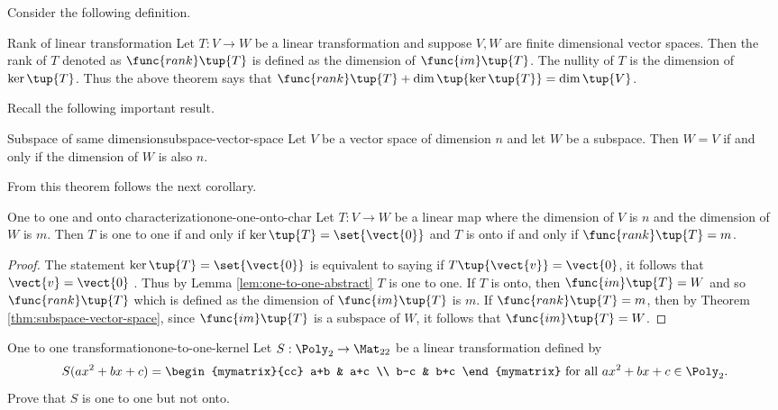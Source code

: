 Consider the following definition. 

\begin{definition}{Rank of linear transformation}{}
Let $T:V\rightarrow W$ be a linear transformation and suppose $V,W$ are finite dimensional vector spaces. Then
the rank of $T$ denoted as $\func{rank}\tup{T} $ is defined as the
dimension of $\func{im}\tup{T}$. The nullity of $T$ is the
dimension of $\ker \tup{T}$. Thus the above theorem says that $
\func{rank}\tup{T} +\dim \tup{\ker \tup{T} } =\dim
\tup{V}$.
\end{definition}

Recall the following important result. 

\begin{theorem}{Subspace of same dimension}{subspace-vector-space}
Let $V$ be a vector space of dimension $n$ and let $W$ be a
subspace. Then $W=V$ if and only if the dimension of $W$ is also $n$.
\end{theorem}

From this theorem follows the next corollary.

\begin{corollary}{One to one and onto characterization}{one-one-onto-char}
Let $T:V\rightarrow W$ be a linear map where the dimension of $V$ is $n$ and
the dimension of $W$ is $m$. Then $T$ is one to one if and only if $\ker
\tup{T} =\set{\vect{0}} $ and $T$ is onto if and only if $
\func{rank}\tup{T} =m$.
\end{corollary}

\begin{proof}
The statement $\ker \tup{T } =\set{\vect{0}} $
is equivalent to saying if $T \tup{\vect{v} }=\vect{0}$, it follows that $\vect{v}=\vect{0}$
. Thus by Lemma \ref{lem:one-to-one-abstract} $T$ is one to one. If $T$ is onto, then $
\func{im}\tup{T} =W$ and so $\func{rank}\tup{T} $ which is
defined as the dimension of $\func{im}\tup{T} $ is $m$. If $\func{
rank}\tup{T} =m$, then by Theorem \ref{thm:subspace-vector-space}, since $\func{im}
\tup{T} $ is a subspace of $W$, it follows that $\func{im}\tup{
T} =W$. 
\end{proof}

\begin{example}{One to one transformation}{one-to-one-kernel}
Let $S:\Poly_2\to\Mat_{22}$ be a linear transformation
defined by
\[ S(ax^2+bx+c)
=
\begin{mymatrix}{cc}
a+b & a+c \\ b-c & b+c \end{mymatrix}
\mbox{ for all }
 ax^2+bx+c\in \Poly_2.\]
Prove that $S$ is one to one but not onto.
\end{example}

